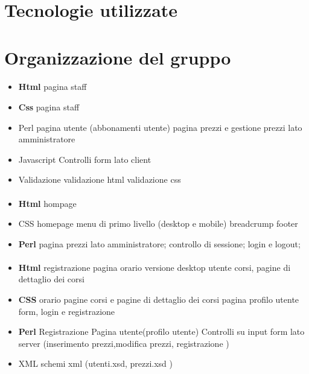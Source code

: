 \documentclass[12pt,a4paper]{article}
\begin{document}
\section{Tecnologie utilizzate}
\appendix
\section{Organizzazione del gruppo}
\paragraph{\TF{}}
\begin{itemize}
	\item \textbf{Html}
	\subitem pagina staff
	\item \textbf{Css}
	\subitem pagina staff
	\item{Perl}
	\subitem pagina utente (abbonamenti utente)
	\subitem pagina prezzi e gestione prezzi lato amministratore
	\item Javascript
	\subitem Controlli form lato client
	\item Validazione
	\subitem validazione html
	\subitem validazione css
	
\end{itemize}
\paragraph{\LB{}}
\begin{itemize}
	\item \textbf{Html}
	\subitem hompage
	\item{CSS}
	\subitem homepage
	\subitem menu di primo livello (desktop e mobile)
	\subitem breadcrump
	\subitem footer
	\item \textbf{Perl}
	\subitem pagina prezzi lato amministratore;
	\subitem controllo di sessione;
	\subitem login e logout;
\end{itemize}
\paragraph{\AB{}}
\begin{itemize}
	\item \textbf{Html}
	\subitem registrazione
	\subitem pagina orario versione desktop
	\subitem utente
	\subitem corsi, pagine di dettaglio dei corsi
	\item \textbf{CSS}
	\subitem orario
	\subitem pagine corsi e pagine di dettaglio dei corsi
	\subitem pagina profilo utente
	\subitem form, login e registrazione
	\item \textbf{Perl}
	\subitem Registrazione
	\subitem Pagina utente(profilo utente)
	\subitem Controlli su input form lato server (inserimento prezzi,modifica prezzi, registrazione )
	\item{XML}
	\subitem schemi xml (utenti.xsd, prezzi.xsd )
\end{itemize}
\end{document}
